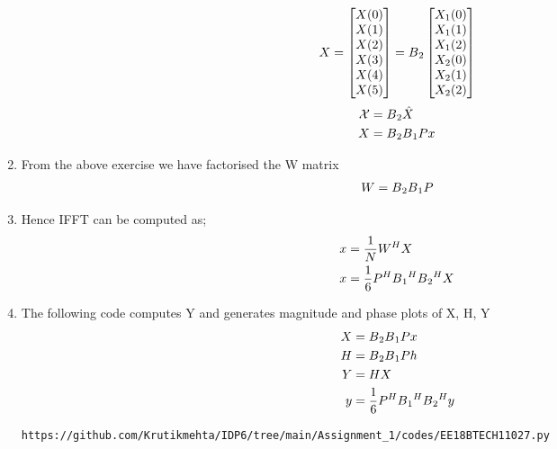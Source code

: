 \documentclass[journal,12pt,twocolumn]{IEEEtran}
\renewcommand\thesection{\arabic{section}}
\begin{document}
\begin{enumerate}[label=\thesection.\arabic*.,ref=\thesection.\theenumi]
\begin{equation}
X = 
\begin{bmatrix}
X(0) \\ 
X(1) \\ 
X(2) \\ 
X(3) \\ 
X(4) \\ 
X(5) 
\end{bmatrix}
= B\textsubscript{2}
\begin{bmatrix}
X_{1}(0) \\ 
X_{1}(1) \\ 
X_{1}(2) \\ 
X_{2}(0) \\ 
X_{2}(1) \\ 
X_{2}(2)
\end{bmatrix}
\end{equation}
\begin{align}
    \mathcal X &= B\textsubscript{2}\hat{X} \\
    X &= B\textsubscript{2}B\textsubscript{1}Px
\end{align}
\item 
From the above exercise we have factorised the W matrix \\
\begin{align}
    W = B\textsubscript{2}B\textsubscript{1}P
\end{align}

\item 
Hence IFFT can be computed as;
\begin{equation}
\begin{aligned}
    x&= \frac{1}{N}W^HX     \\
    x&= \frac{1}{6}P^HB\textsubscript{1}^HB\textsubscript{2}^HX
\end{aligned}
\end{equation}
\item 
The following code computes Y and generates magnitude and phase plots of X, H, Y
\begin{equation}
\begin{aligned}
    X&= B\textsubscript{2}B\textsubscript{1}Px \\
    H&= B\textsubscript{2}B\textsubscript{1}Ph \\
    Y&= HX \\
    y&= \frac{1}{6}P^HB\textsubscript{1}^HB\textsubscript{2}^Hy

\end{aligned}
\end{equation}
\begin{lstlisting}
https://github.com/Krutikmehta/IDP6/tree/main/Assignment_1/codes/EE18BTECH11027.py
\end{lstlisting}


\end{enumerate}
\end{document}
